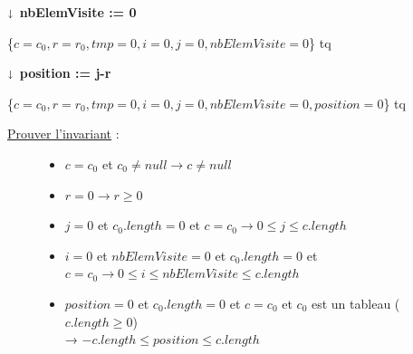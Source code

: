 	\textbf{$\shortdownarrow$ nbElemVisite := 0}
	
	\begin{description}
		\item[\{$c=c_0, r=r_0, tmp=0, i=0, j=0, nbElemVisite=0$\} tq] 
	\end{description}
	\newpage
	\textbf{$\shortdownarrow$ position := j-r}
	
	\begin{description}
		\item[\{$c=c_0, r=r_0, tmp=0, i=0, j=0, nbElemVisite=0, position=0 $\} tq] 
	\end{description}	
	

	\begin{description}
		\item[\underline{Prouver l’invariant} :] \hspace{2pt}
		\begin{itemize}
			\item $ c=c_0$ et $c_0 \neq null → c \neq null $
			\item $ r=0 → r \geq 0 $
			\item $ j=0$ et $c_0.length = 0$ et $c=c_0 → 0 \leq j \leq c.length $
			\item $ i=0$  et $nbElemVisite=0$ et $c_0.length = 0$ et $c=c_0 → 0 \leq i \leq nbElemVisite \leq c.length $
			\item $ position = 0$ et $c_0.length = 0$ et $c=c_0$ et $c_0$ est un tableau ($c.length \geq 0$) \\→  $-c.length \leq position \leq c.length$
		\end{itemize}
		
	\end{description}
	

